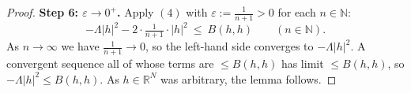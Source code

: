 \begin{proof}
\medskip\noindent\textbf{Step 6: $\varepsilon\to0^{+}$.} Apply $(4)$ with
$\varepsilon:=\frac1{n+1}>0$ for each $n\in\mathbb N$:
\[
 -\Lambda|h|^{2}-2\cdot\tfrac1{n+1}\cdot|h|^{2}\ \le\ B(h,h)\qquad(n\in\mathbb N).
\]
As $n\to\infty$ we have $\frac1{n+1}\to0$, so the left-hand side converges to
$-\Lambda|h|^{2}$. A convergent sequence all of whose terms are $\le B(h,h)$ has limit
$\le B(h,h)$, so $-\Lambda|h|^{2}\le B(h,h)$. As $h\in\mathbb R^{N}$ was arbitrary, the
lemma follows.
\end{proof}
